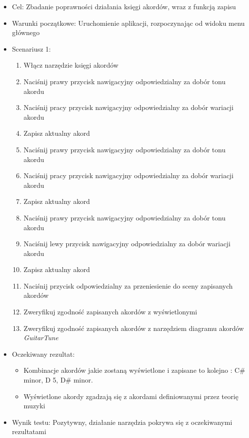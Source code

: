 \begin{itemize}
    \item Cel: Zbadanie poprawności działania księgi akordów, wraz z funkcją zapisu
    \item Warunki początkowe: Uruchomienie aplikacji, rozpoczynając od widoku menu głównego
    \item Scenariusz 1: 
        \begin{enumerate}
            \item Włącz narzędzie księgi akordów
            \item Naciśnij prawy przycisk nawigacyjny odpowiedzialny za dobór tonu akordu
            \item Naciśnij pracy przycisk nawigacyjny odpowiedzialny za dobór wariacji akordu
            \item Zapisz aktualny akord
            \item Naciśnij prawy przycisk nawigacyjny odpowiedzialny za dobór tonu akordu
            \item Naciśnij pracy przycisk nawigacyjny odpowiedzialny za dobór wariacji akordu
            \item Zapisz aktualny akord
            \item Naciśnij prawy przycisk nawigacyjny odpowiedzialny za dobór tonu akordu
            \item Naciśnij lewy przycisk nawigacyjny odpowiedzialny za dobór wariacji akordu
            \item Zapisz aktualny akord
            \item Naciśnij przycisk odpowiedzialny za przeniesienie do sceny zapisanych akordów
            \item Zweryfikuj zgodność zapisanych akordów z wyświetlonymi
            \item Zweryfikuj zgodność zapisanych akordów z narzędziem diagramu akordów \emph{GuitarTune}
        \end{enumerate}
    \item Oczekiwany rezultat: 
        \begin{itemize}
            \item Kombinacje akordów jakie zostaną wyświetlone i zapisane to kolejno : C\# minor, D 5, D\# minor. 
            \item Wyświetlone akordy zgadzają się z akordami definiowanymi przez teorię muzyki
        \end{itemize}
    \item Wynik testu: Pozytywny, działanie narzędzia pokrywa się z oczekiwanymi rezultatami

\end{itemize}

